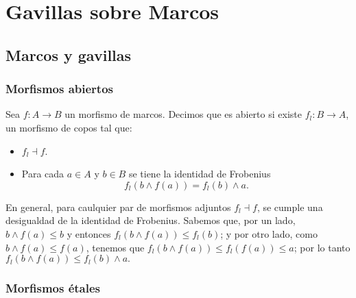 \chapter{Gavillas sobre Marcos}

\section{Marcos y gavillas}

\subsection{Morfismos abiertos}

\begin{definition}
    Sea $f:A\to B$ un morfismo de marcos. Decimos que es abierto si existe $f_l:B\to A$, un morfismo de copos tal que:
    \begin{itemize}
        \item $f_l\dashv f$.
        \item Para cada $a\in A$ y $b\in B$ se tiene la identidad de Frobenius 
            $$f_l(b\wedge f(a))=f_l(b)\wedge a.$$
    \end{itemize}
\end{definition}

\begin{obs}
    En general, para caulquier par de morfismos adjuntos $f_l\dashv f$, se cumple una desigualdad de la identidad de Frobenius.
    Sabemos que, por un lado, $b\wedge f(a)\leq b$ y entonces $f_l(b\wedge f(a))\leq f_l(b)$; y por otro lado,
    como $b\wedge f(a)\leq f(a)$, tenemos que $f_l(b\wedge f(a))\leq f_l(f(a))\leq a$; por lo tanto $f_l(b\wedge f(a))\leq f_l(b)\wedge a.$
\end{obs}

\subsection{Morfismos étales}

